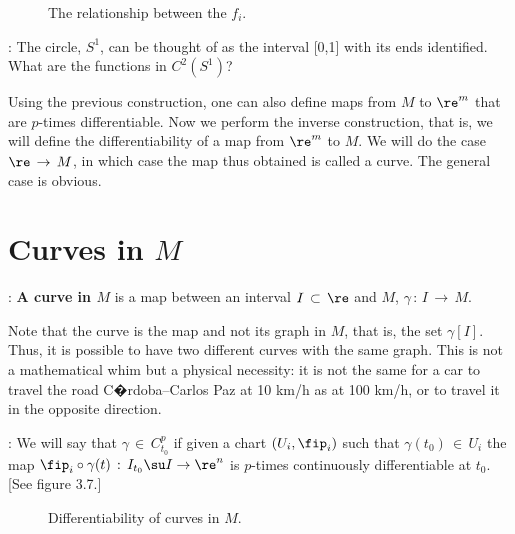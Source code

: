 \begin{figure}[htbp]
  \begin{center}
    \caption{The relationship between the $f_i$.}
    \label{fig:3_6}
  \end{center}
\end{figure}

\ejer: The circle, $S^1$, can be thought of as the interval [0,1] with its ends identified. 
What are the functions in $C^2(S^1)$?

\espa
Using the previous construction, one can also define maps from $M$ to $\re^m$ that are $p$-times differentiable. Now we perform the inverse construction, that is, we will define the differentiability of a map from $\re^m$ to $M$. We will do the case $\re\,\to\,M$, in which case the map thus obtained is called a curve. The general case is obvious.


\section {Curves in $M$}



: {\bf A curve in $M$} is a map between an interval
$I\,\subset\,\re$ and $M$, $\gamma\,:\,I\,\to\,M$. 

Note that the curve
is the map and not its graph in $M$, that is, the set $\gamma[I]$. 
Thus, it is possible to have
two different curves with the same graph. This is not a mathematical whim
but a physical necessity: it is not the same for a car to travel the road C�rdoba--Carlos Paz at 10 km/h as at 100 km/h,
or to travel it in the opposite direction.

: We will say that $\gamma\,\in\,C_{t_0}^p$ if given a chart $(U_i,\fip_i)$
such that $\gamma(t_0)\,\in\,U_i$ the map
$\fip_i\circ\gamma(t)\,:\,I_{t_0}\su I\to\re^n$ is $p$-times
continuously differentiable at $t_0$.
[See figure 3.7.] 


\espa 

\begin{figure}[htbp]
  \begin{center}
    \caption{Differentiability of curves in $M$.}
    \label{fig:3_7}
  \end{center}
\end{figure}

